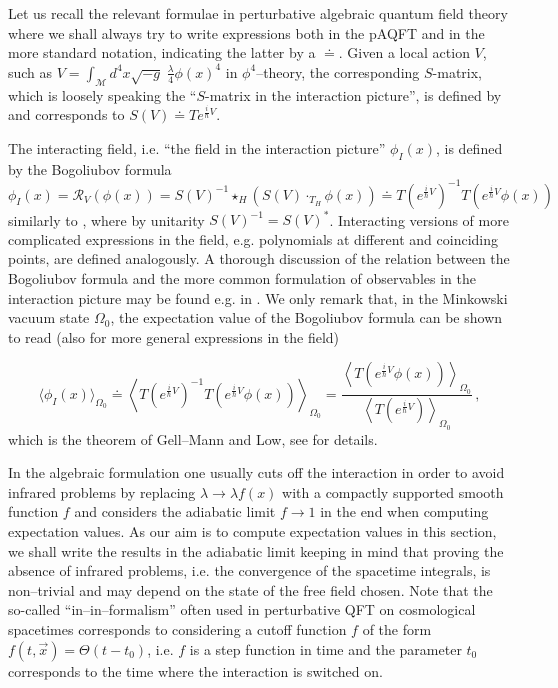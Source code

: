 \documentclass[10pt]{book}
\newcommand{\Mcal}{\mathcal{M}}
\theoremstyle{break}
\begin{document}
Let us recall the relevant formulae in perturbative algebraic quantum field theory where we shall always try to write expressions both in the pAQFT and in the more standard notation, indicating the latter by a $\doteq$. Given a local action $V$, such as $V=\int_\Mcal d^4x \sqrt{-g} \; \frac{\lambda}{4} \phi(x)^4$ in $\phi^4$--theory, the corresponding $S$-matrix, which is loosely speaking the ``$S$-matrix in the interaction picture'', is defined by %
and corresponds to $S(V)\doteq T e^{\frac{i}{\hbar} V}$.

The interacting field, i.e. ``the field in the interaction picture'' $\phi_I(x)$, is defined by the Bogoliubov formula
\begin{equation}
\phi_I(x)=\mathcal{R}_V(\phi(x))=S(V)^{-1}\star_H\left(S(V)\cdot_{T_H} \phi(x)\right)\doteq T(e^{\frac{i}{\hbar} V})^{-1} T(e^{\frac{i}{\hbar} V}\phi(x))\,
\end{equation}
similarly to %
, where by unitarity $S(V)^{-1}=S(V)^*$. Interacting versions of more complicated expressions in the field, e.g. polynomials at different and coinciding points, are defined analogously. A thorough discussion of the relation between the Bogoliubov formula and the more common formulation of observables in the interaction picture may be found e.g. in %
. We only remark that, in the Minkowski vacuum state $\Omega_0$, the expectation value of the Bogoliubov formula can be shown to read (also for more general expressions in the field)

$$\langle \phi_I(x)\rangle_{\Omega_0} \doteq \left\langle T(e^{\frac{i}{\hbar} V})^{-1}T(e^{\frac{i}{\hbar} V}\phi(x))\right\rangle_{\Omega_0}=\frac{\left\langle T(e^{\frac{i}{\hbar} V}\phi(x))\right\rangle_{\Omega_0}}{\left\langle T(e^{\frac{i}{\hbar} V}) \right\rangle_{\Omega_0}}\,,$$
which is the theorem of Gell--Mann and Low, see %
for details.

In the algebraic formulation one usually cuts off the interaction in order to avoid infrared problems by replacing $\lambda\to \lambda f(x)$ with a compactly supported smooth function $f$ and considers the adiabatic limit $f\to 1$ in the end when computing expectation values. As our aim is to compute expectation values in this section, we shall write the results in the adiabatic limit keeping in mind that proving the absence of infrared problems, i.e. the convergence of the spacetime integrals, is non--trivial and may depend on the state of the free field chosen. Note that the so-called ``in--in--formalism'' often used in perturbative QFT on cosmological spacetimes corresponds to considering a cutoff function $f$ of the form $f(t,\vec{x}) = \Theta(t-t_0)$, i.e. $f$ is a step function in time and the parameter $t_0$ corresponds to the time where the interaction is switched on.
\end{document}
